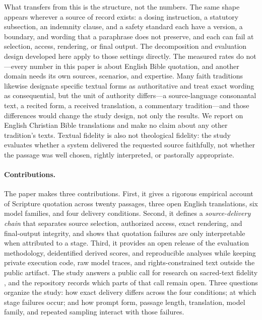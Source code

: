 \documentclass[11pt]{article}
\begin{document}
What transfers from this is the structure, not the numbers. The same shape
appears wherever a source of record exists: a dosing instruction, a statutory
subsection, an indemnity clause, and a safety standard each have a version, a
boundary, and wording that a paraphrase does not preserve, and each can fail at
selection, access, rendering, or final output. The decomposition and evaluation
design developed here apply to those settings directly. The measured rates do
not---every number in this paper is about English Bible quotation, and another
domain needs its own sources, scenarios, and expertise. Many faith traditions
likewise designate specific textual forms as authoritative and treat exact
wording as consequential, but the unit of authority differs---a source-language
consonantal text, a recited form, a received translation, a commentary
tradition---and those differences would change the study design, not only the
results. We report on English Christian Bible translations and make no claim about
any other tradition's texts. Textual fidelity is also not theological fidelity:
the study evaluates whether a system delivered the requested source faithfully,
not whether the passage was well chosen, rightly interpreted, or pastorally
appropriate.

\paragraph{Contributions.}
The paper makes three contributions. First, it gives a rigorous empirical
account of Scripture quotation across twenty passages, three open English
translations, six model families, and four delivery conditions. Second, it defines
a \emph{source-delivery chain} that separates source selection, authorized
access, exact rendering, and final-output integrity, and shows that quotation
failures are only interpretable when attributed to a stage. Third, it provides
an open release of the evaluation methodology, deidentified derived
scores, and reproducible analyses while keeping private execution code, raw model traces, and
rights-constrained text outside the public artifact. The study answers a public
call for research on sacred-text fidelity \citep{fid056call}, and the
repository records which parts of that call remain open. Three questions organize
the study: how exact delivery differs across the four
conditions; at which stage failures occur; and how prompt form, passage
length, translation, model family, and repeated sampling interact with those
failures.
\end{document}
